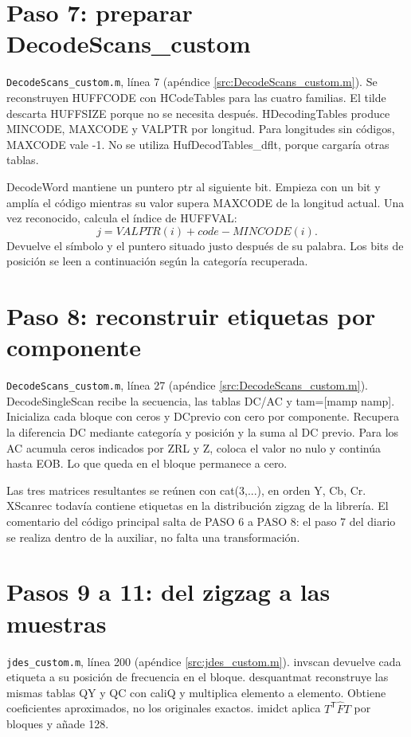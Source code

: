 \documentclass[11pt,a4paper,oneside]{report}
\begin{document}
\section{Paso 7: preparar DecodeScans\_custom}
\texttt{DecodeScans\_custom.m}, línea 7 (apéndice \ref{src:DecodeScans_custom.m}).
Se reconstruyen HUFFCODE con HCodeTables para las cuatro familias. El tilde
descarta HUFFSIZE porque no se necesita después. HDecodingTables produce
MINCODE, MAXCODE y VALPTR por longitud. Para longitudes sin códigos, MAXCODE
vale -1. No se utiliza HufDecodTables\_dflt, porque cargaría otras tablas.

DecodeWord mantiene un puntero ptr al siguiente bit. Empieza con un bit y
amplía el código mientras su valor supera MAXCODE de la longitud actual.
Una vez reconocido, calcula el índice de HUFFVAL:
\[
j=VALPTR(i)+code-MINCODE(i).
\]
Devuelve el símbolo y el puntero situado justo después de su palabra.
Los bits de posición se leen a continuación según la categoría recuperada.


\section{Paso 8: reconstruir etiquetas por componente}
\texttt{DecodeScans\_custom.m}, línea 27 (apéndice \ref{src:DecodeScans_custom.m}).
DecodeSingleScan recibe la secuencia, las tablas DC/AC y tam=[mamp namp].
Inicializa cada bloque con ceros y DCprevio con cero por componente. Recupera
la diferencia DC mediante categoría y posición y la suma al DC previo.
Para los AC acumula ceros indicados por ZRL y Z, coloca el valor no nulo y
continúa hasta EOB. Lo que queda en el bloque permanece a cero.

Las tres matrices resultantes se reúnen con cat(3,...), en orden Y, Cb, Cr.
XScanrec todavía contiene etiquetas en la distribución zigzag de la librería.
El comentario del código principal salta de PASO 6 a PASO 8: el paso 7 del
diario se realiza dentro de la auxiliar, no falta una transformación.


\section{Pasos 9 a 11: del zigzag a las muestras}
\texttt{jdes\_custom.m}, línea 200 (apéndice \ref{src:jdes_custom.m}).
invscan devuelve cada etiqueta a su posición de frecuencia en el bloque.
desquantmat reconstruye las mismas tablas QY y QC con caliQ y multiplica
elemento a elemento. Obtiene coeficientes aproximados, no los originales exactos.
imidct aplica $T^{\mathsf T}\widehat F T$ por bloques y añade 128.
\end{document}

